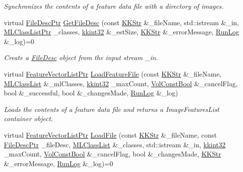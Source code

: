 \begin{DoxyCompactItemize}
\begin{DoxyCompactList}\small\item\em Synchronizes the contents of a feature data file with a directory of images. \end{DoxyCompactList}\item 
virtual \hyperlink{namespace_k_k_m_l_l_aa0d0b6ab4ec18868a399b8455b05d914}{File\+Desc\+Ptr} \hyperlink{class_k_k_m_l_l_1_1_feature_file_i_o_a485b98b04884febb9423e7c613e2d654}{Get\+File\+Desc} (const \hyperlink{class_k_k_b_1_1_k_k_str}{K\+K\+Str} \&\+\_\+file\+Name, std\+::istream \&\+\_\+in, \hyperlink{namespace_k_k_m_l_l_af091cde3f4a4315658b41a5e7583fc26}{M\+L\+Class\+List\+Ptr} \+\_\+classes, \hyperlink{namespace_k_k_b_a8fa4952cc84fda1de4bec1fbdd8d5b1b}{kkint32} \&\+\_\+est\+Size, \hyperlink{class_k_k_b_1_1_k_k_str}{K\+K\+Str} \&\+\_\+error\+Message, \hyperlink{class_k_k_b_1_1_run_log}{Run\+Log} \&\+\_\+log)=0
\begin{DoxyCompactList}\small\item\em Create a \hyperlink{class_k_k_m_l_l_1_1_file_desc}{File\+Desc} object from the input stream \textquotesingle{}\+\_\+in\textquotesingle{}. \end{DoxyCompactList}\item 
virtual \hyperlink{namespace_k_k_m_l_l_acf2ba92a3cf03e2b19674b24ff488ef6}{Feature\+Vector\+List\+Ptr} \hyperlink{class_k_k_m_l_l_1_1_feature_file_i_o_a75a8d10d3981811ab10357f6a95c9bc1}{Load\+Feature\+File} (const \hyperlink{class_k_k_b_1_1_k_k_str}{K\+K\+Str} \&\+\_\+file\+Name, \hyperlink{class_k_k_m_l_l_1_1_m_l_class_list}{M\+L\+Class\+List} \&\+\_\+ml\+Classes, \hyperlink{namespace_k_k_b_a8fa4952cc84fda1de4bec1fbdd8d5b1b}{kkint32} \+\_\+max\+Count, \hyperlink{namespace_k_k_b_a7d390f568e2831fb76b86b56c87bf92f}{Vol\+Const\+Bool} \&\+\_\+cancel\+Flag, bool \&\+\_\+successful, bool \&\+\_\+changes\+Made, \hyperlink{class_k_k_b_1_1_run_log}{Run\+Log} \&\+\_\+log)
\begin{DoxyCompactList}\small\item\em Loads the contents of a feature data file and returns a Image\+Features\+List container object. \end{DoxyCompactList}\item 
virtual \hyperlink{namespace_k_k_m_l_l_acf2ba92a3cf03e2b19674b24ff488ef6}{Feature\+Vector\+List\+Ptr} \hyperlink{class_k_k_m_l_l_1_1_feature_file_i_o_a49e80ac6eff874c8145559d9453b68d5}{Load\+File} (const \hyperlink{class_k_k_b_1_1_k_k_str}{K\+K\+Str} \&\+\_\+file\+Name, const \hyperlink{namespace_k_k_m_l_l_aa0d0b6ab4ec18868a399b8455b05d914}{File\+Desc\+Ptr} \+\_\+file\+Desc, \hyperlink{class_k_k_m_l_l_1_1_m_l_class_list}{M\+L\+Class\+List} \&\+\_\+classes, std\+::istream \&\+\_\+in, \hyperlink{namespace_k_k_b_a8fa4952cc84fda1de4bec1fbdd8d5b1b}{kkint32} \+\_\+max\+Count, \hyperlink{namespace_k_k_b_a7d390f568e2831fb76b86b56c87bf92f}{Vol\+Const\+Bool} \&\+\_\+cancel\+Flag, bool \&\+\_\+changes\+Made, \hyperlink{class_k_k_b_1_1_k_k_str}{K\+K\+Str} \&\+\_\+error\+Message, \hyperlink{class_k_k_b_1_1_run_log}{Run\+Log} \&\+\_\+log)=0

\end{DoxyCompactItemize}
